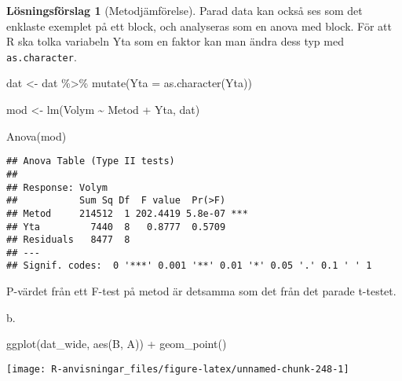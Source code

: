 \documentclass[
]{book}
\newenvironment{Shaded}{\begin{snugshade}}{\end{snugshade}}
\newcommand{\AttributeTok}[1]{\textcolor[rgb]{0.77,0.63,0.00}{#1}}
\newcommand{\FunctionTok}[1]{\textcolor[rgb]{0.00,0.00,0.00}{#1}}
\newcommand{\NormalTok}[1]{#1}
\newcommand{\OtherTok}[1]{\textcolor[rgb]{0.56,0.35,0.01}{#1}}
\newcommand{\SpecialCharTok}[1]{\textcolor[rgb]{0.00,0.00,0.00}{#1}}
\theoremstyle{definition}
\theoremstyle{definition}
\theoremstyle{definition}
\theoremstyle{definition}
\newtheorem{hypothesis}{Lösningsförslag}[chapter]
\theoremstyle{remark}
\begin{document}
\begin{hypothesis}[Metodjämförelse]
Parad data kan också ses som det enklaste exemplet på ett block, och analyseras som en anova med block. För att R ska tolka variabeln Yta som en faktor kan man ändra dess typ med \texttt{as.character}.

\begin{Shaded}
\begin{Highlighting}[]
\NormalTok{dat }\OtherTok{\textless{}{-}}\NormalTok{ dat }\SpecialCharTok{\%\textgreater{}\%} \FunctionTok{mutate}\NormalTok{(}\AttributeTok{Yta =} \FunctionTok{as.character}\NormalTok{(Yta))}

\NormalTok{mod }\OtherTok{\textless{}{-}} \FunctionTok{lm}\NormalTok{(Volym }\SpecialCharTok{\textasciitilde{}}\NormalTok{ Metod }\SpecialCharTok{+}\NormalTok{ Yta, dat)}

\FunctionTok{Anova}\NormalTok{(mod)}
\end{Highlighting}
\end{Shaded}

\begin{verbatim}
## Anova Table (Type II tests)
## 
## Response: Volym
##           Sum Sq Df  F value  Pr(>F)    
## Metod     214512  1 202.4419 5.8e-07 ***
## Yta         7440  8   0.8777  0.5709    
## Residuals   8477  8                     
## ---
## Signif. codes:  0 '***' 0.001 '**' 0.01 '*' 0.05 '.' 0.1 ' ' 1
\end{verbatim}

P-värdet från ett F-test på metod är detsamma som det från det parade t-testet.

b.

\begin{Shaded}
\begin{Highlighting}[]
\FunctionTok{ggplot}\NormalTok{(dat\_wide, }\FunctionTok{aes}\NormalTok{(B, A)) }\SpecialCharTok{+} 
  \FunctionTok{geom\_point}\NormalTok{()}
\end{Highlighting}
\end{Shaded}

\begin{center}\texttt{[image: R-anvisningar\_files/figure-latex/unnamed-chunk-248-1]} \end{center}

\begin{Shaded}
\end{Shaded}


\end{hypothesis}
\end{document}
